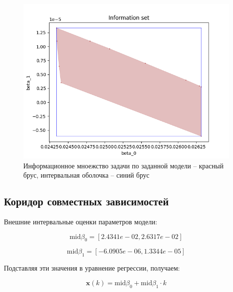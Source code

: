 \begin{figure}[H]
	\begin{center}
		\includegraphics[scale = 0.55]{inform_set.png}
	\end{center}
	\caption{Информационное мноежство задачи по заданной модели -- красный брус, интервальная оболочка -- синий брус}
\end{figure}

\subsection{Коридор совместных зависимостей}

Внешние интервальные оценки параметров модели: 

\begin{equation*}
	\text{mid} \beta_0 = [2.4341e-02,2.6317e-02]
\end{equation*}

\begin{equation*}
	\text{mid} \beta_1 = [-6.0905e-06,1.3344e-05]
\end{equation*}

Подставляя эти значения в уравнение регрессии, получаем:

\begin{equation}
	\bm{x}(k) = \text{mid} \beta_0 + \text{mid} \beta_1 \cdot k
\end{equation}

